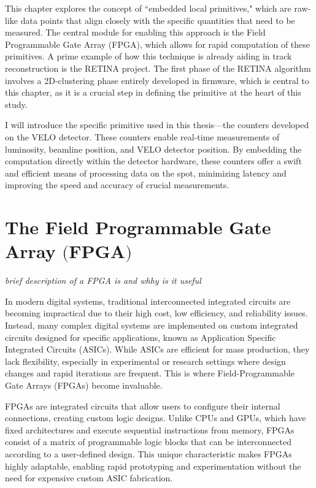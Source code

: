 This chapter explores the concept of ``embedded local primitives," which are raw-like data points that align closely with the specific quantities that need to be measured. The central module for enabling this approach is the Field Programmable Gate Array (FPGA), which allows for rapid computation of these primitives. A prime example of how this technique is already aiding in track reconstruction is the RETINA project. The first phase of the RETINA algorithm involves a 2D-clustering phase entirely developed in firmware, which is central to this chapter, as it is a crucial step in defining the primitive at the heart of this study.

I will introduce the specific primitive used in this thesis—the counters developed on the VELO detector. These counters enable real-time measurements of luminosity, beamline position, and VELO detector position. By embedding the computation directly within the detector hardware, these counters offer a swift and efficient means of processing data on the spot, minimizing latency and improving the speed and accuracy of crucial measurements. 


\section[The Field Programmable Gate Array]{The Field Programmable Gate Array $\bigl($FPGA$\bigr)$}
\textit{brief description of a FPGA is and whhy is it useful}

In modern digital systems, traditional interconnected integrated circuits are becoming impractical due to their high cost, low efficiency, and reliability issues. Instead, many complex digital systems are implemented on custom integrated circuits designed for specific applications, known as Application Specific Integrated Circuits (ASICs). While ASICs are efficient for mass production, they lack flexibility, especially in experimental or research settings where design changes and rapid iterations are frequent. This is where Field-Programmable Gate Arrays (FPGAs) become invaluable.

FPGAs are integrated circuits that allow users to configure their internal connections, creating custom logic designs. Unlike CPUs and GPUs, which have fixed architectures and execute sequential instructions from memory, FPGAs consist of a matrix of programmable logic blocks that can be interconnected according to a user-defined design. This unique characteristic makes FPGAs highly adaptable, enabling rapid prototyping and experimentation without the need for expensive custom ASIC fabrication.

